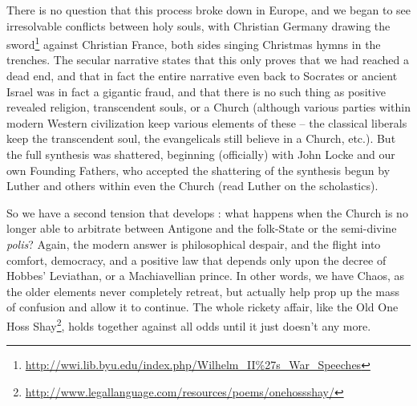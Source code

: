 There is no question that this process broke down in Europe, and we began to see irresolvable conflicts between holy souls, with Christian Germany drawing the sword\footnote{\url{http://wwi.lib.byu.edu/index.php/Wilhelm\_II\%27s\_War\_Speeches}} against Christian France, both sides singing Christmas hymns in the trenches. The secular narrative states that this only proves that we had reached a dead end, and that in fact the entire narrative even back to Socrates or ancient Israel was in fact a gigantic fraud, and that there is no such thing as positive revealed religion, transcendent souls, or a Church (although various parties within modern Western civilization keep various elements of these -- the classical liberals keep the transcendent soul, the evangelicals still believe in a Church, etc.). But the full synthesis was shattered, beginning (officially) with John Locke and our own Founding Fathers, who accepted the shattering of the synthesis begun by Luther and others within even the Church (read Luther on the scholastics).

So we have a second tension that develops : what happens when the Church is no longer able to arbitrate between Antigone and the folk-State or the semi-divine \emph{polis}? Again, the modern answer is philosophical despair, and the flight into comfort, democracy, and a positive law that depends only upon the decree of Hobbes' Leviathan, or a Machiavellian prince. In other words, we have Chaos, as the older elements never completely retreat, but actually help prop up the mass of confusion and allow it to continue. The whole rickety affair, like the Old One Hoss Shay\footnote{\url{http://www.legallanguage.com/resources/poems/onehossshay/}}, holds together against all odds until it just doesn't any more.

